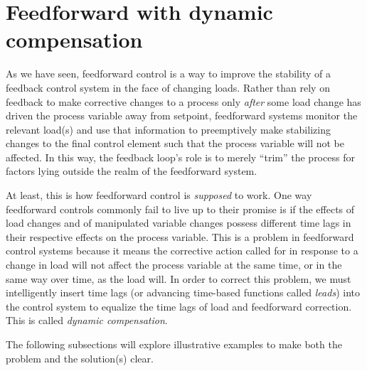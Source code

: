 \filbreak
\section{Feedforward with dynamic compensation}

As we have seen, feedforward control is a way to improve the stability of a feedback control system in the face of changing loads.  Rather than rely on feedback to make corrective changes to a process only \textit{after} some load change has driven the process variable away from setpoint, feedforward systems monitor the relevant load(s) and use that information to preemptively make stabilizing changes to the final control element such that the process variable will not be affected.  In this way, the feedback loop's role is to merely ``trim'' the process for factors lying outside the realm of the feedforward system.

At least, this is how feedforward control is \textit{supposed} to work.  One way feedforward controls commonly fail to live up to their promise is if the effects of load changes and of manipulated variable changes possess different time lags in their respective effects on the process variable.  This is a problem in feedforward control systems because it means the corrective action called for in response to a change in load will not affect the process variable at the same time, or in the same way over time, as the load will.  In order to correct this problem, we must intelligently insert time lags (or advancing time-based functions called \textit{leads}) into the control system to equalize the time lags of load and feedforward correction.  This is called \textit{dynamic compensation}.  

The following subsections will explore illustrative examples to make both the problem and the solution(s) clear.

\vskip 10pt

